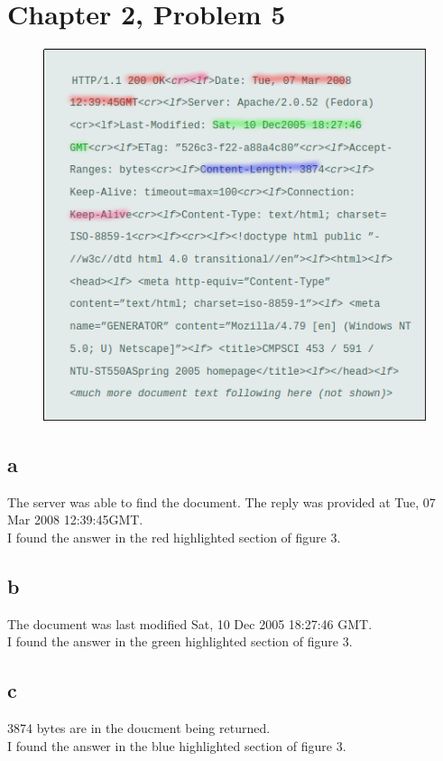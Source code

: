 \documentclass{article}
\begin{document}
\section{Chapter 2, Problem 5}
\begin{figure}[h!]
\centering
\includegraphics[scale=0.65]{Q5.png}
\caption{}
\end{figure}

\subsection{a}
The server was able to find the document.  The reply was provided at Tue, 07 Mar 2008 12:39:45GMT.\\
\newline I found the answer in the red highlighted section of figure 3.\\

\subsection{b}
The document was last modified Sat, 10 Dec 2005 18:27:46 GMT.\\
\newline I found the answer in the green highlighted section of figure 3.\\

\subsection{c}
3874 bytes are in the doucment being returned.\\
\newline I found the answer in the blue highlighted section of figure 3.\\
\end{document}
